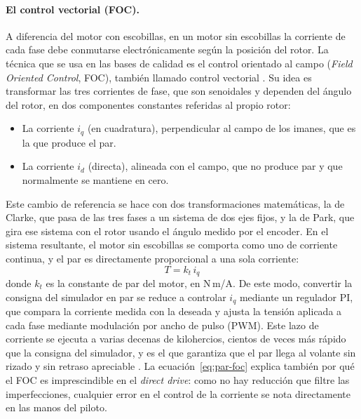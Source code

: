 \paragraph{El control vectorial (FOC).}
A diferencia del motor con escobillas, en un motor sin escobillas la corriente de cada fase debe conmutarse electrónicamente según la posición del rotor. La técnica que se usa en las bases de calidad es el control orientado al campo (\textit{Field Oriented Control}, FOC), también llamado control vectorial \parencite{krishnan_2010_pmsm}. Su idea es transformar las tres corrientes de fase, que son senoidales y dependen del ángulo del rotor, en dos componentes constantes referidas al propio rotor:
\begin{itemize}
	\item La corriente $i_q$ (en cuadratura), perpendicular al campo de los imanes, que es la que produce el par.
	\item La corriente $i_d$ (directa), alineada con el campo, que no produce par y que normalmente se mantiene en cero.
\end{itemize}
Este cambio de referencia se hace con dos transformaciones matemáticas, la de Clarke, que pasa de las tres fases a un sistema de dos ejes fijos, y la de Park, que gira ese sistema con el rotor usando el ángulo medido por el encoder. En el sistema resultante, el motor sin escobillas se comporta como uno de corriente continua, y el par es directamente proporcional a una sola corriente:
\begin{equation}
	T = k_t \, i_q
	\label{eq:par-foc}
\end{equation}
donde $k_t$ es la constante de par del motor, en N\,m/A. De este modo, convertir la consigna del simulador en par se reduce a controlar $i_q$ mediante un regulador PI, que compara la corriente medida con la deseada y ajusta la tensión aplicada a cada fase mediante modulación por ancho de pulso (PWM). Este lazo de corriente se ejecuta a varias decenas de kilohercios, cientos de veces más rápido que la consigna del simulador, y es el que garantiza que el par llega al volante sin rizado y sin retraso apreciable \parencite{briz_2000_current_regulators}. La ecuación~\ref{eq:par-foc} explica también por qué el FOC es imprescindible en el \textit{direct drive}: como no hay reducción que filtre las imperfecciones, cualquier error en el control de la corriente se nota directamente en las manos del piloto.

